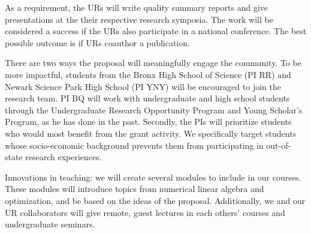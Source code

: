 As a requirement, the URs will write quality summary reports and give
presentations at the their respective research symposia. The work will be
considered a success if the URs also participate in a national conference.
The best possible outcome is if URs coauthor a publication.

There are two ways the proposal will meaningfully engage the community.
To be more impactful, students from the Bronx High School of Science
(PI RR) and Newark Science Park High School (PI YNY) will be encouraged
to join the research team. PI BQ will work with undergraduate and high
school students through the Undergraduate Research Opportunity Program
and Young Scholar's Program, as he has done in the past. Secondly, the
PIs will prioritize students who would most benefit from the grant activity.
We specifically target students whose socio-economic background prevents
them from participating in out-of-state research experiences. 

Innovations in teaching: we will create several modules to include
in our courses. These modules will introduce topics from numerical linear
algebra and optimization, and be based on the ideas of the proposal.
Additionally, we and our UR collaborators will give remote, guest lectures
in each others' courses and undergraduate seminars. 



